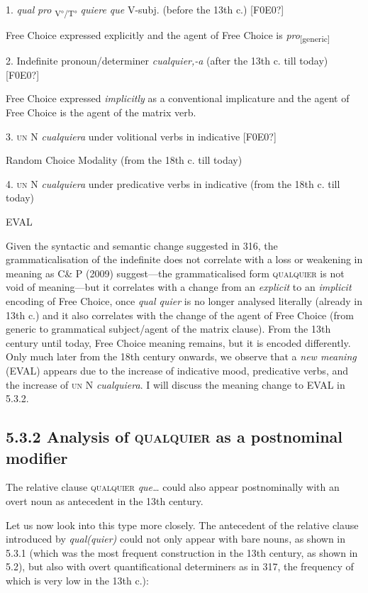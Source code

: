   1.  \textit{qual} \textit{pro} \textsubscript{V°/T°} \textit{quiere que} V-subj. (before the 13th c.) [F0E0?]

    Free Choice expressed explicitly and the agent of Free Choice is \textit{pro}\textsubscript{[generic]}

{} 2.{  Indefinite pronoun/determiner} {\textit{cualquier,-a}}{ (after the 13th c. till today) [F0E0?]}

{    Free Choice expressed} {\textit{implicitly}}{ as a conventional implicature and the agent of Free Choice is the agent of the matrix verb.}

  3.  \textsc{un} N \textit{cualquiera} under volitional verbs in indicative [F0E0?]

{    Random Choice Modality (from the 18th c. till today)}

  4.  \textsc{un} N \textit{cualquiera} under predicative verbs in indicative (from the 18th c. till today)

EVAL

Given the syntactic and semantic change suggested in 316, the grammaticalisation of the indefinite does not correlate with a loss or weakening in meaning as C\& P (2009) suggest—the grammaticalised form \textsc{qualquier} is not void of meaning—but it correlates with a change from an \textit{explicit} to an \textit{implicit} encoding of Free Choice, once \textit{qual quier} is no longer analysed literally (already in 13th c.) and it also correlates with the change of the agent of Free Choice (from generic to grammatical subject/agent of the matrix clause). From the 13th century until today, Free Choice meaning remains, but it is encoded differently. Only much later from the 18th century onwards, we observe that a \textit{new meaning} (EVAL) appears due to the increase of indicative mood, predicative verbs, and the increase of \textsc{un} N \textit{cualquiera}. I will discuss the meaning change to EVAL in 5.3.2.

\subsection{\textbf{5.3.2} \textbf{Analysis} \textbf{of} \textbf{\textsc{qualquier}} \textbf{as} \textbf{a} \textbf{postnominal} \textbf{modifier}}

The relative clause \textsc{qualquier} \textit{que…} could also appear postnominally with an overt noun as antecedent in the 13th century.

  Let us now look into this type more closely. The antecedent of the relative clause introduced by \textit{qual(quier)} could not only appear with bare nouns, as shown in 5.3.1 (which was the most frequent construction in the 13th century, as shown in 5.2), but also with overt quantificational determiners as in 317, the frequency of which is very low in the 13th c.):

